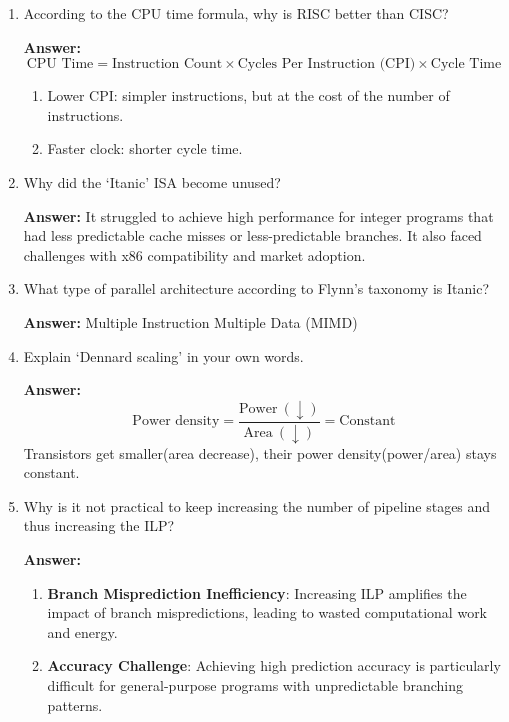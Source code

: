 \documentclass[a4paper,12pt]{article}
\begin{document}
\begin{enumerate}
    \item According to the CPU time formula, why is RISC better than CISC?

    \textbf{Answer:}
    \[
    \text{CPU Time} = \text{Instruction Count} \times \text{Cycles Per Instruction (CPI)} \times \text{Cycle Time}
    \]
    \begin{enumerate}
        \item Lower CPI: simpler instructions, but at the cost of the number of instructions.
        \item Faster clock: shorter cycle time.
    \end{enumerate}

    \item Why did the `Itanic' ISA become unused?

    \textbf{Answer:}
    It struggled to achieve high performance for integer programs that had less predictable cache misses or less-predictable branches.
    It also faced challenges with x86 compatibility and market adoption.

    \item What type of parallel architecture according to Flynn's taxonomy is Itanic?

    \textbf{Answer:}
    Multiple Instruction Multiple Data (MIMD)

    \newpage

    \item Explain `Dennard scaling' in your own words.

    \textbf{Answer:}
    \[
    \text{Power density} = \frac{\text{Power}\ (\downarrow)}{\text{Area}\ (\downarrow)} = \text{Constant}
    \]
    Transistors get smaller(area decrease), their power density(power/area) stays constant.

    \item Why is it not practical to keep increasing the number of pipeline stages and thus increasing the ILP?

    \textbf{Answer:}
    \begin{enumerate}
        \item \textbf{Branch Misprediction Inefficiency}: Increasing ILP amplifies the impact of branch mispredictions, leading to wasted computational work and energy.

        \item \textbf{Accuracy Challenge}: Achieving high prediction accuracy is particularly difficult for general-purpose programs with unpredictable branching patterns.


\end{enumerate}
\end{enumerate}
\end{document}
